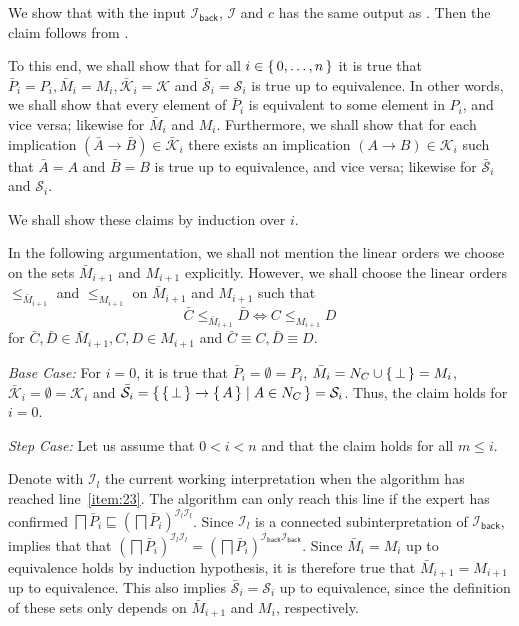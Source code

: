 \begin{Proof}
  We show that  with the input
  $\mathcal{I}_{\mathsf{back}}$, $\mathcal{I}$ and $c$ has the same output as
  .  Then the claim follows from
  .

  To this end, we shall show that for all $i \in {\ensuremath{\{\, 0, \dots, n \,\}}}$ it is true that
  $\bar P_{i} = P_{i}, \bar M_{i} = M_{i}, \bar{\mathcal{K}}_{i} = \mathcal{K}$ and
  $\bar{\mathcal{S}}_{i} = \mathcal{S}_{i}$ is true up to equivalence.  In other words, we
  shall show that every element of $\bar P_{i}$ is equivalent to some element in $P_{i}$,
  and vice versa; likewise for $\bar M_{i}$ and $M_{i}$.  Furthermore, we shall show that
  for each implication $(\bar A \to \bar B) \in \bar{\mathcal{K}}_{i}$ there exists an
  implication $(A \to B) \in \mathcal{K}_{i}$ such that $\bar A = A$ and $\bar B = B$ is
  true up to equivalence, and vice versa; likewise for $\bar{\mathcal{S}}_{i}$ and
  $\mathcal{S}_{i}$.

  We shall show these claims by induction over $i$.

  In the following argumentation, we shall not mention the linear orders we choose on the
  sets $\bar M_{i+1}$ and $M_{i+1}$ explicitly.  However, we shall
  choose the linear orders $\leq_{\bar M_{i+1}}$ and $\leq_{M_{i+1}}$ on $\bar M_{i+1}$
  and $M_{i+1}$ such that
  \begin{equation*}
    \bar C \leq_{\bar M_{i+1}} \bar D \iff C \leq_{M_{i+1}} D
  \end{equation*}
  for $\bar C, \bar D \in \bar M_{i+1}, C, D \in M_{i+1}$ and $\bar C \equiv C, \bar D
  \equiv D$.

  \textit{Base Case: }  For $i = 0$, it is true that $\bar P_{i} = \emptyset = P_{i}$,
  $\bar M_{i} = N_{C} \cup {\ensuremath{\{\, \bot \,\}}} = M_{i}$, $\bar{\mathcal{K}}_{i} = \emptyset =
  \mathcal{K}_{i}$ and $\bar{\mathcal{S}}_{i} = {\{\, {\{\, \bot \,\}} \to {\ensuremath{\{\, A \,\}}} \mid A
    \in N_{C} \,\}} = \mathcal{S}_{i}$.  Thus, the claim holds for $i = 0$.

  \textit{Step Case: } Let us assume that $0 < i < n$ and that the claim holds for all $m
  \leq i$.

  Denote with $\mathcal{I}_{l}$ the current working interpretation when the algorithm has
  reached line~\ref{item:23}.  The algorithm can only reach this line if the expert has
  confirmed $\bigsqcap \bar P_{i} \sqsubseteq (\bigsqcap \bar
  P_{i})^{\mathcal{I}_{l}\mathcal{I}_{l}}$.  Since $\mathcal{I}_{l}$ is a connected
  subinterpretation of $\mathcal{I}_{\mathsf{back}}$,  implies that
  that $(\bigsqcap \bar P_{i})^{\mathcal{I}_{l}\mathcal{I}_{l}} = (\bigsqcap \bar
  P_{i})^{\mathcal{I}_{\mathsf{back}}\mathcal{I}_{\mathsf{back}}}$.  Since $\bar M_{i} =
  M_{i}$ up to equivalence holds by induction hypothesis, it is therefore true that $\bar
  M_{i+1} = M_{i+1}$ up to equivalence.  This also implies $\bar{\mathcal{S}}_{i} =
  \mathcal{S}_{i}$ up to equivalence, since the definition of these sets only depends on
  $\bar M_{i+1}$ and $M_{i}$, respectively.


\end{Proof}
